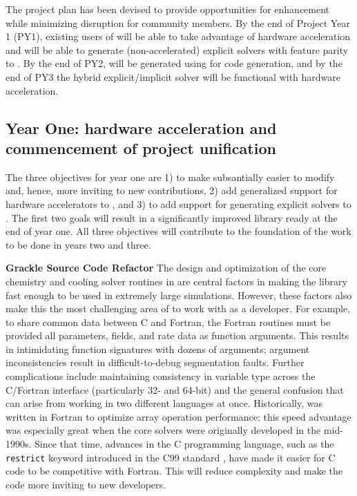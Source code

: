 The project plan has been devised to provide opportunities for enhancement
while minimizing disruption for community members.  By the end of Project Year
1 (PY1), existing users of \grackle{} will be able to take advantage of hardware
acceleration and \dengo{} will be able to generate (non-accelerated) explicit
solvers with feature parity to \grackle{}.  By the end of PY2, \grackle{} will
be generated using \dengo{} for code generation, and by the end of PY3 the
hybrid explicit/implicit solver will be functional with hardware acceleration.

\subsection{Year One: hardware acceleration and commencement of project unification}

The three objectives for year one are 1) to make \grackle{} subsantially
easier to modify and, hence, more inviting to new contributions, 2)
add generalized support for hardware accelerators to \grackle{}, and
3) to add support for generating explicit solvers to \dengo{}.  The
first two goals will result in a significantly improved \grackle{}
library ready at the end of year one. All three objectives will
contribute to the foundation of the work to be done in years two and
three.

\noindent \textbf{Grackle Source Code Refactor}
The design and optimization of the core chemistry and cooling solver
routines in \grackle{} are central factors in making the library fast
enough to be used in extremely large simulations.  However, these
factors also make this the most challenging area of \grackle{} to
work with as a developer.  For example, to share common data between C and
Fortran, the
Fortran routines must be provided all parameters, fields,
and rate data as function arguments.  This results in intimidating
function signatures with dozens of arguments;
argument inconsistencies result in difficult-to-debug segmentation
faults.
Further complications include maintaining
consistency in variable type across the C/Fortran interface (particularly 32-
and 64-bit) and the
general confusion that can arise from working in two different
languages at once.  
Historically, \grackle{} was written in Fortran to optimize array operation
performance; this speed advantage was especially great when the core solvers
were originally developed in the mid-1990s.  Since that time, advances in the C
programming language, such as the \texttt{restrict} keyword introduced in the
C99 standard \citep{c99}, have made it easier for C code to be competitive
with Fortran.  This will reduce complexity and make the code more inviting to
new developers.

